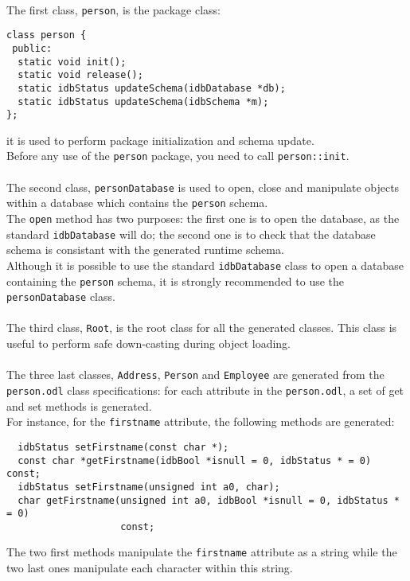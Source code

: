 \\
The first class, \texttt{person}, is the package class:
\verbsize \begin{verbatim}
class person {
 public:
  static void init();
  static void release();
  static idbStatus updateSchema(idbDatabase *db);
  static idbStatus updateSchema(idbSchema *m);
};
\end{verbatim}
\normalsize
it is used to perform package initialization and schema update.\\
Before any use of the \texttt{person} package, you need to call
\texttt{person::init}. \\
\\
The second class, \texttt{personDatabase} is used to open, close and
manipulate objects within a database which contains the \texttt{person} schema.
\\
The \texttt{open} method has two
purposes: the first one is to open the database, as the standard
\texttt{idbDatabase} will do; the second one is to check that the database
schema is consistant with the generated runtime schema.\\
Although it is possible to use the standard \texttt{idbDatabase} class to open
a database containing the \texttt{person} schema, it is strongly recommended
to use the \texttt{personDatabase} class.
\\
\\
The third class, \texttt{Root}, is the root class for all the generated classes.
This class is useful to perform safe down-casting during object loading.
\\
\\
The three last classes, \texttt{Address}, \texttt{Person} and \texttt{Employee}
are generated from the \texttt{person.odl} class specifications: for each
attribute in the \texttt{person.odl}, a set of get and set methods is generated.
\\
For instance, for the \texttt{firstname} attribute, the following methods
are generated:
\verbsize \begin{verbatim}
  idbStatus setFirstname(const char *);
  const char *getFirstname(idbBool *isnull = 0, idbStatus * = 0) const;
  idbStatus setFirstname(unsigned int a0, char);
  char getFirstname(unsigned int a0, idbBool *isnull = 0, idbStatus * = 0)
                    const;
\end{verbatim}
\normalsize
The two first methods manipulate the \texttt{firstname} attribute as a string
while the two last ones manipulate each character within this string.
\\
